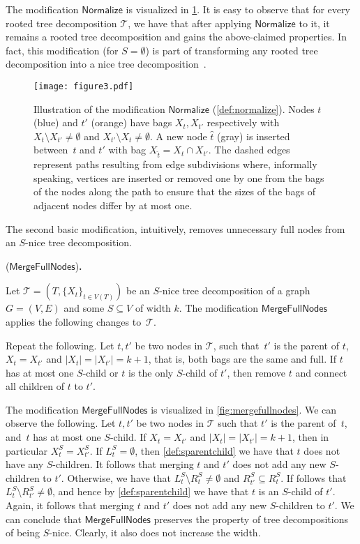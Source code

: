 \documentclass[a4paper,UKenglish,cleveref, autoref, thm-restate, numberwithinsect]{lipics-v2021}
\newcounter{modification}
\newenvironment{modification}[1][]{\refstepcounter{modification}\renewcommand{\arraystretch}{.6}
\begin{center}
\begin{mdframed}[nobreak=true]{\normalsize\sffamily{\bfseries Modification~\themodification} (#1){\bfseries .}}

\vspace{.5ex}
\begin{normalsize}
}
{
\end{normalsize}
\end{mdframed}
\end{center}
}
\newcommand{\Normalize}{\mathsf{Normalize}}
\newcommand{\MergeFullNodes}{\mathsf{MergeFullNodes}}
\begin{document}
The modification $\Normalize$ is visualized in \cref{fig:normalize}. It is easy to observe that for every rooted tree decomposition $\mathcal{T}$, we have that after applying $\Normalize$ to it, it remains a rooted tree decomposition and gains the above-claimed properties. In fact, this modification (for $S=\emptyset$) is part of transforming any rooted tree decomposition into a nice tree decomposition~\cite{bodlaender1996efficient,Die16}. 


\begin{figure}[t]
\centering
\texttt{[image: figure3.pdf]}
    \caption{Illustration of the modification $\Normalize$ (\cref{def:normalize}). Nodes $t$ (blue) and $t'$ (orange) have bags $X_t, X_{t'}$ respectively with $X_t\setminus X_{t'}\neq \emptyset$ and $X_{t'}\setminus X_{t}\neq \emptyset$. A new node $\hat{t}$ (gray) is inserted between~$t$ and $t'$ with bag $X_{\hat{t}}=X_t\cap X_{t'}$. The dashed edges represent paths resulting from edge subdivisions where, informally speaking, vertices are inserted or removed one by one from the bags of the nodes along the path to ensure that the sizes of the bags of adjacent nodes differ by at most one.}\label{fig:normalize}
\end{figure}


The second basic modification, intuitively, removes unnecessary full nodes from an $S$-nice tree decomposition.

\begin{modification}[$\MergeFullNodes$]\label{def:mergefullnodes}
Let $\mathcal{T}=(T,\{X_t\}_{t\in V(T)})$ be an $S$-nice tree decomposition of a graph $G=(V,E)$ and some $S\subseteq V$ of width $k$. The modification $\MergeFullNodes$ applies the following changes to~$\mathcal{T}$.

Repeat the following. Let $t,t'$ be two nodes in $\mathcal{T}$, such that~$t'$ is the parent of $t$, $X_t=X_{t'}$ and $|X_t|=|X_{t'}|=k+1$, that is, both bags are the same and full. If $t$ has at most one $S$-child or $t$ is the only $S$-child of $t'$, then remove $t$ and connect all children of $t$ to $t'$.
\end{modification}

The modification $\MergeFullNodes$ is visualized in \cref{fig:mergefullnodes}. We can observe the following. Let $t,t'$ be two nodes in $\mathcal{T}$ such that $t'$ is the parent of~$t$, and~$t$ has at most one $S$-child. 
If $X_t=X_{t'}$ and $|X_t|=|X_{t'}|=k+1$, then in particular $X^S_t=X^S_{t'}$.
If $L^S_t=\emptyset$, then \cref{def:sparentchild} we have that $t$ does not have any $S$-children. It follows that merging $t$ and $t'$ does not add any new $S$-children to $t'$. Otherwise, we have that $L^S_{t}\setminus R^S_{t}\neq\emptyset$ and $R^S_{t'}\subseteq R^S_{t}$. If follows that $L^S_t\setminus R^S_{t'}\neq\emptyset$, and hence by \cref{def:sparentchild} we have that $t$ is an $S$-child of $t'$. Again, it follows that merging $t$ and $t'$ does not add any new $S$-children to $t'$. 
We can conclude that $\MergeFullNodes$ preserves the property of tree decompositions of being $S$-nice. Clearly, it also does not increase the width.
\end{document}
